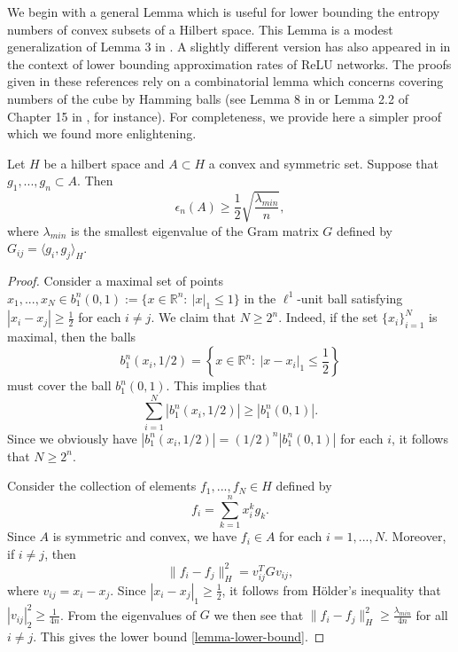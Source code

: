 We begin with a general Lemma which is useful for lower bounding the entropy numbers of convex subsets of a Hilbert space. This Lemma is a modest generalization of Lemma 3 in \cite{makovoz1996random}. A slightly different version has also appeared in  \cite{klusowski2018approximation} in the context of lower bounding approximation rates of ReLU networks. The proofs given in these references rely on a combinatorial lemma which concerns covering numbers of the cube by Hamming balls (see  Lemma 8 in \cite{lorentz1966metric} or Lemma 2.2 of Chapter 15 in \cite{lorentz1996constructive}, for instance). For completeness, we provide here a simpler proof which we found more enlightening.
\begin{lemma}\label{lower-eigenvalue-lemma}
 Let $H$ be a hilbert space and $A\subset H$ a convex and symmetric set. Suppose that $g_1,...,g_n\subset A$. Then
 \begin{equation}\label{lemma-lower-bound}
  \epsilon_{n}(A)\geq \frac{1}{2}\sqrt{\frac{\lambda_{min}}{n}},
 \end{equation}
 where $\lambda_{min}$ is the smallest eigenvalue of the Gram matrix $G$ defined by $G_{ij} = \langle g_i,g_j\rangle_H$.
\end{lemma}
\begin{proof}
 Consider a maximal set of points $x_1,...,x_N\in b_1^n(0,1):=\{x\in \mathbb{R}^n:~|x|_1\leq 1\}$ in the $\ell^1$-unit ball satisfying $|x_i - x_j| \geq \frac{1}{2}$ for each $i\neq j$. We claim that $N \geq 2^n$. Indeed, if the set $\{x_i\}_{i=1}^N$ is maximal, then the balls 
 $$b^n_1(x_i,1/2) = \left\{x\in \mathbb{R}^n:~|x-x_i|_1\leq \frac{1}{2}\right\}$$
 must cover the ball $b_1^n(0,1)$. This implies that
 \begin{equation}
  \sum_{i=1}^N |b^n_1(x_i,1/2)| \geq |b_1^n(0,1)|.
 \end{equation}
 Since we obviously have $|b^n_1(x_i,1/2)| = (1/2)^n|b_1^n(0,1)|$ for each $i$, it follows that $N \geq 2^n$.
 
Consider the collection of elements $f_1,...,f_N\in H$ defined by
 \begin{equation}
  f_i = \sum_{k=1}^nx^k_ig_k.
 \end{equation}
 Since $A$ is symmetric and convex, we have $f_i\in A$ for each $i=1,...,N$. Moreover, if $i\neq j$, then
 \begin{equation}
  \|f_i-f_j\|^2_H = v^T_{ij}Gv_{ij},
 \end{equation}
 where $v_{ij} = x_i - x_j$. Since $|x_i - x_j|_1 \geq \frac{1}{2}$, it follows from H\"older's inequality that $|v_{ij}|^2_2 \geq \frac{1}{4n}$. From the eigenvalues of $G$ we then see that $\|f_i-f_j\|^2_H \geq \frac{\lambda_{min}}{4n}$ for all $i\neq j$. This gives the lower bound \eqref{lemma-lower-bound}.
\end{proof}

